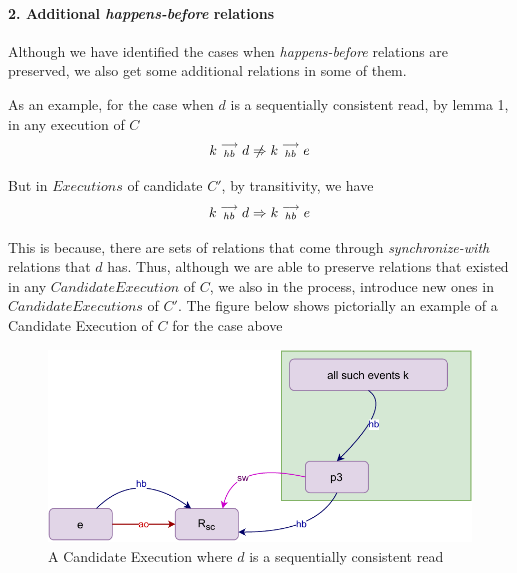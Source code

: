 
\paragraph{2. Additional \textit{happens-before} relations}
    Although we have identified the cases when \textit{happens-before} relations are preserved, we also get some additional relations in some of them.

    As an example, for the case when $d$ is a sequentially consistent read, by lemma 1, in any execution of $C$
    \[
        \reln{k}{hb}{d} \centernot\Rightarrow \reln{k}{hb}{e} 
    \]

    But in $Executions$ of candidate $C'$, by transitivity, we have 
    \[
        k\stackrel{\longrightarrow}{_{hb}}d \Rightarrow k\stackrel{\longrightarrow}{_{hb}}e 
    \]

    This is because, there are sets of relations that come through \textit{synchronize-with} relations that $d$ has. Thus, although we are able to preserve relations that existed in any $Candidate Execution$ of $C$, we also in the process, introduce new ones in $Candidate Executions$ of $C'$. The figure below shows pictorially an example of a Candidate Execution of $C$ for the case above 

    \begin{figure}[H]
        \centering
        \includegraphics[scale=0.7]{InstructionReordering/ValidReorderingProof/ProofParts/Part2/part2(c).pdf}
        \caption{A Candidate Execution where $d$ is a sequentially consistent read}
        \label{fig:my_label}
    \end{figure}

